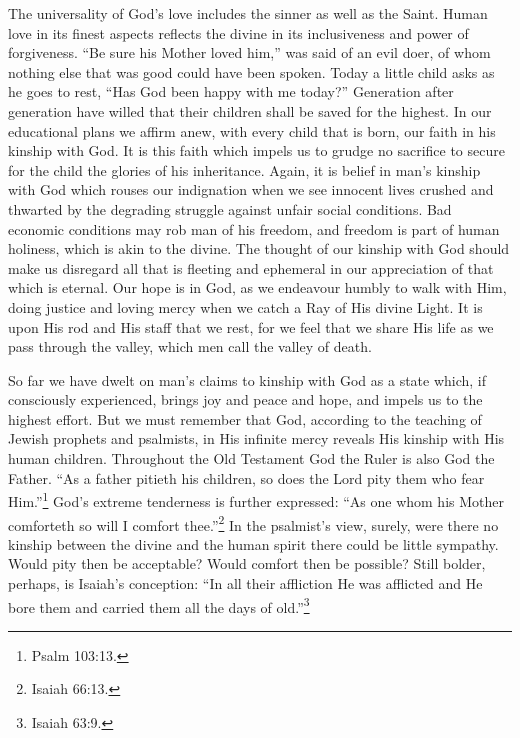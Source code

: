 The universality of God's love includes the sinner as
well as the Saint. Human love in its finest aspects
reflects the divine in its inclusiveness and power of
forgiveness. ``Be sure his Mother loved him,'' was said of
an evil doer, of whom nothing else that was good could have
been spoken. Today a little child asks as he goes to
rest, ``Has God been happy with me today?'' Generation after
generation have willed that their children shall be saved
for the highest. In our educational plans we affirm anew,
with every child that is born, our faith in his kinship
with God. It is this faith which impels us to grudge no
sacrifice to secure for the child the glories of his
inheritance. Again, it is belief in man's kinship with God
which rouses our indignation when we see innocent lives
crushed and thwarted by the degrading struggle against
unfair social conditions. Bad economic conditions may rob
man of his freedom, and freedom is part of human holiness,
which is akin to the divine. The thought of our kinship
with God should make us disregard all that is fleeting and
ephemeral in our appreciation of that which is eternal.
Our hope is in God, as we endeavour humbly to walk with
Him, doing justice and loving mercy when we catch a Ray of
His divine Light. It is upon His rod and His staff that we
rest, for we feel that we share His life as we pass through
the valley, which men call the valley of death.

So far we have dwelt on man’s claims to kinship with
God as a state which, if consciously experienced, brings
joy and peace and hope, and impels us to the highest
effort. But we must remember that God, according to the
teaching of Jewish prophets and psalmists, in His infinite
mercy reveals His kinship with His human children.
Throughout the Old Testament God the Ruler is also God the
Father. ``As a father pitieth his children, so does the
Lord pity them who fear Him.''\footnote{Psalm 103:13.} God's extreme tenderness is
further expressed: ``As one whom his Mother comforteth so
will I comfort thee.''\footnote{Isaiah 66:13.} In the psalmist's view, surely, were
there no kinship between the divine and the human spirit
there could be little sympathy. Would pity then be acceptable?
Would comfort then be possible? Still bolder,
perhaps, is Isaiah's conception: ``In all their affliction
He was afflicted and He bore them and carried them all the
days of old.''\footnote{Isaiah 63:9.}

